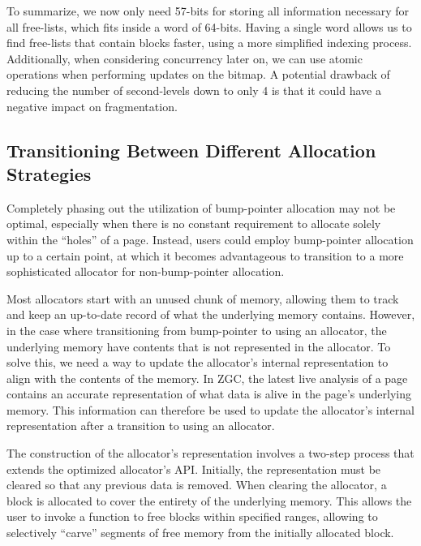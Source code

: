 To summarize, we now only need 57-bits for storing all information necessary for all free-lists, which fits inside a word of 64-bits. Having a single word allows us to find free-lists that contain blocks faster, using a more simplified indexing process. Additionally, when considering concurrency later on, we can use atomic operations when performing updates on the bitmap. A potential drawback of reducing the number of second-levels down to only 4 is that it could have a negative impact on fragmentation.


\subsection{Transitioning Between Different Allocation Strategies}

Completely phasing out the utilization of bump-pointer allocation may not be optimal, especially when there is no constant requirement to allocate solely within the ``holes'' of a page. Instead, users could employ bump-pointer allocation up to a certain point, at which it becomes advantageous to transition to a more sophisticated allocator for non-bump-pointer allocation.

Most allocators start with an unused chunk of memory, allowing them to track and keep an up-to-date record of what the underlying memory contains. However, in the case where transitioning from bump-pointer to using an allocator, the underlying memory have contents that is not represented in the allocator. To solve this, we need a way to update the allocator's internal representation to align with the contents of the memory. In ZGC, the latest live analysis of a page contains an accurate representation of what data is alive in the page's underlying memory. This information can therefore be used to update the allocator's internal representation after a transition to using an allocator.

The construction of the allocator's representation involves a two-step process that extends the optimized allocator's API. Initially, the representation must be cleared so that any previous data is removed. When clearing the allocator, a block is allocated to cover the entirety of the underlying memory. This allows the user to invoke a function to free blocks within specified ranges, allowing to selectively ``carve'' segments of free memory from the initially allocated block.

